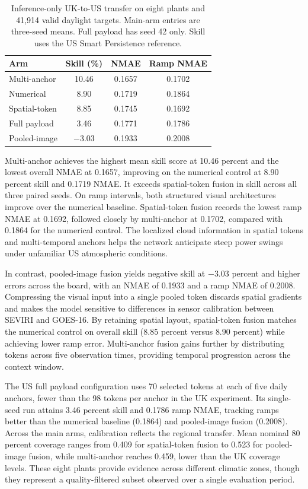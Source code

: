 \begin{table}[htbp]\centering
\small
\setlength{\tabcolsep}{6pt}
\begin{tabular}{@{}lccc@{}}\hline
Arm & Skill (\%) & NMAE & Ramp NMAE \\\hline
Multi-anchor & 10.46 & 0.1657 & 0.1702 \\
Numerical & 8.90 & 0.1719 & 0.1864 \\
Spatial-token & 8.85 & 0.1745 & 0.1692 \\
Full payload & 3.46 & 0.1771 & 0.1786 \\
Pooled-image & $-3.03$ & 0.1933 & 0.2008 \\\hline
\end{tabular}
\caption{Inference-only UK-to-US transfer on eight plants and 41,914 valid daylight targets. Main-arm entries are three-seed means. Full payload has seed 42 only. Skill uses the US Smart Persistence reference.}
\label{tab:us-mmtsfm-transfer}
\end{table}

Multi-anchor achieves the highest mean skill score at 10.46 percent and the lowest overall NMAE at 0.1657, improving on the numerical control at 8.90 percent skill and 0.1719 NMAE. It exceeds spatial-token fusion in skill across all three paired seeds. On ramp intervals, both structured visual architectures improve over the numerical baseline. Spatial-token fusion records the lowest ramp NMAE at 0.1692, followed closely by multi-anchor at 0.1702, compared with 0.1864 for the numerical control. The localized cloud information in spatial tokens and multi-temporal anchors helps the network anticipate steep power swings under unfamiliar US atmospheric conditions.

In contrast, pooled-image fusion yields negative skill at $-3.03$ percent and higher errors across the board, with an NMAE of 0.1933 and a ramp NMAE of 0.2008. Compressing the visual input into a single pooled token discards spatial gradients and makes the model sensitive to differences in sensor calibration between SEVIRI and GOES-16. By retaining spatial layout, spatial-token fusion matches the numerical control on overall skill ($8.85$ percent versus $8.90$ percent) while achieving lower ramp error. Multi-anchor fusion gains further by distributing tokens across five observation times, providing temporal progression across the context window.

The US full payload configuration uses 70 selected tokens at each of five daily anchors, fewer than the 98 tokens per anchor in the UK experiment. Its single-seed run attains 3.46 percent skill and 0.1786 ramp NMAE, tracking ramps better than the numerical baseline (0.1864) and pooled-image fusion (0.2008). Across the main arms, calibration reflects the regional transfer. Mean nominal 80 percent coverage ranges from 0.409 for spatial-token fusion to 0.523 for pooled-image fusion, while multi-anchor reaches 0.459, lower than the UK coverage levels. These eight plants provide evidence across different climatic zones, though they represent a quality-filtered subset observed over a single evaluation period.


